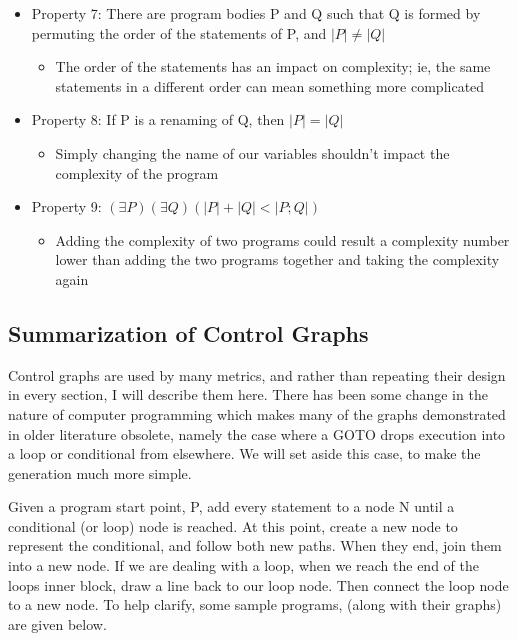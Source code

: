 \documentclass[]{article}
\begin{document}
\begin{itemize}
	\item Property 7: There are program bodies P and Q such that Q is formed by permuting the order of the statements of P, and $|P| \neq |Q|$
	\begin{itemize}
		\item The order of the statements has an impact on complexity; ie, the same statements in a different order can mean something more complicated
	\end{itemize}
	\item Property 8: If P is a renaming of Q, then $|P| = |Q|$
	\begin{itemize}
		\item Simply changing the name of our variables shouldn't impact the complexity of the program
	\end{itemize}
	\item Property 9: $(\exists P)(\exists Q)(|P|+|Q| < |P; Q|)$
	\begin{itemize}
		\item Adding the complexity of two programs could result a complexity number lower than adding the two programs together and taking the complexity again
	\end{itemize}
\end{itemize}

\subsection{Summarization of Control Graphs}

Control graphs are used by many metrics, and rather than repeating their design in every section, I will describe them here. 
There has been some change in the nature of computer programming which makes many of the graphs demonstrated in older literature obsolete, namely the case where a GOTO drops execution into a loop or conditional from elsewhere.
We will set aside this case, to make the generation much more simple.

Given a program start point, P, add every statement to a node N until a conditional (or loop) node is reached.
At this point, create a new node to represent the conditional, and follow both new paths.
When they end, join them into a new node.
If we are dealing with a loop, when we reach the end of the loops inner block, draw a line back to our loop node. 
Then connect the loop node to a new node. 
To help clarify, some sample programs, (along with their graphs) are given below.
\end{document}
